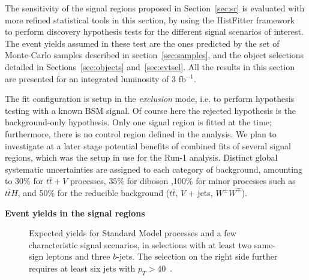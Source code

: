 The sensitivity of the signal regions proposed in Section~\ref{sec:sr} is evaluated with more refined statistical tools in this section, 
by using the HistFitter framework~\cite{HistFitter} to perform discovery hypothesis tests for the different signal scenarios of interest. 
The event yields assumed in these test are the ones predicted by the set of Monte-Carlo samples described in section~\ref{sec:samples}, 
and the object selections detailed in Sections~\ref{sec:objects} and~\ref{sec:evtsel}. All the results in this section are presented for an integrated luminosity of 3 fb$^{-1}$. 

The fit configuration is setup in the \textit{exclusion} mode, i.e. to perform hypothesis testing with a known BSM signal. 
Of course here the rejected hypothesis is the background-only hypothesis. 
Only one signal region is fitted at the time; furthermore, there is no control region defined in the analysis. 
We plan to investigate at a later stage potential benefits of combined fits of several signal regions, 
which was the setup in use for the Run-1 analysis. 
Distinct global systematic uncertainties are assigned to each category of background, amounting to 30\% for $t\bar t+V$ processes, $35\%$ for diboson ,100\% for minor processes such as $t\bar tH$, and 50\% for the reducible background ($t\bar t$, $V$ + jets, $W^\pm W^\mp$). 
\\
\par{\bf Event yields in the signal regions\\}

\begin{figure}[htb!]
\centering
{}
\caption{Expected yields for Standard Model processes and a few characteristic signal scenarios, 
in selections with at least two same-sign leptons and three $b$-jets. The selection on the right side further requires at least six jets with $p_T>40$~\GeV. 
}
\label{fig:histfitter_sr3b}
\end{figure}

